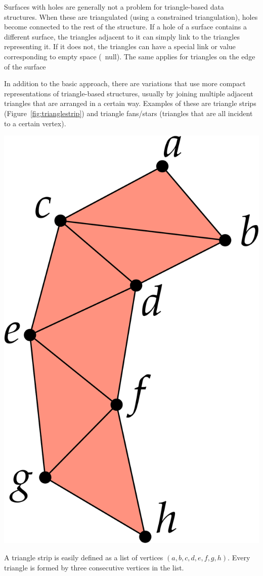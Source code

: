 Surfaces with holes are generally not a problem for triangle-based data structures.
When these are triangulated (using a constrained triangulation), holes become connected to the rest of the structure.
If a hole of a surface contains a different surface, the triangles adjacent to it can simply link to the triangles representing it.
If it does not, the triangles can have a special link or value corresponding to empty space (\eg\ null).
The same applies for triangles on the edge of the surface

In addition to the basic approach, there are variations that use more compact representations of triangle-based structures, usually by joining multiple adjacent triangles that are arranged in a certain way.
Examples of these are triangle strips (Figure~\ref{fig:trianglestrip}) and triangle fans/stars (triangles that are all incident to a certain vertex).

\begin{marginfigure}
\centering
\includegraphics[width=\linewidth]{figs/trianglestrip}
\caption{A triangle strip is easily defined as a list of vertices \((a,b,c,d,e,f,g,h)\). Every triangle is formed by three consecutive vertices in the list.}%
\label{fig:trianglestrip}
\end{marginfigure}

